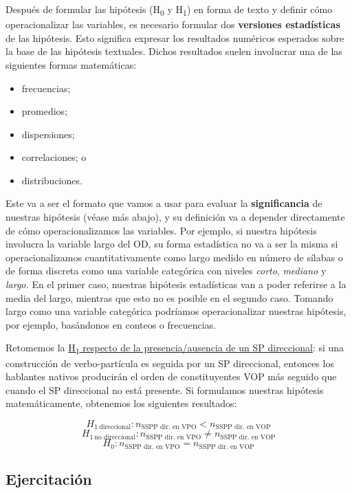 \documentclass[12pt,spanish,a4paper,]{article}
\providecommand{\tightlist}{%
  \setlength{\itemsep}{0pt}\setlength{\parskip}{0pt}}
\begin{document}
Después de formular las hipótesis (H\textsubscript{0} y
H\textsubscript{1}) en forma de texto y definir cómo operacionalizar las
variables, es necesario formular dos \textbf{versiones estadísticas} de
las hipótesis. Esto significa expresar los resultados numéricos
esperados sobre la base de las hipótesis textuales. Dichos resultados
suelen involucrar una de las siguientes formas matemáticas:

\begin{itemize}
\tightlist
\item
  frecuencias;
\item
  promedios;
\item
  dispersiones;
\item
  correlaciones; o
\item
  distribuciones.
\end{itemize}

Este va a ser el formato que vamos a usar para evaluar la
\textbf{significancia} de nuestras hipótesis (véase más abajo), y su
definición va a depender directamente de cómo operacionalizamos las
variables. Por ejemplo, si nuestra hipótesis involucra la variable largo
del OD, su forma estadística no va a ser la misma si operacionalizamos
cuantitativamente como largo medido en número de sílabas o de forma
discreta como una variable categórica con niveles \emph{corto},
\emph{mediano} y \emph{largo.} En el primer caso, nuestras hipótesis
estadísticas van a poder referirse a la media del largo, mientras que
esto no es posible en el segundo caso. Tomando largo como una variable
categórica podríamos operacionalizar nuestras hipótesis, por ejemplo,
basándonos en conteos o frecuencias.

Retomemos la \protect\hyperlink{h1}{H\textsubscript{1} respecto de la
presencia/ausencia de un SP direccional}: si una construcción de
verbo-partícula es seguida por un SP direccional, entonces los hablantes
nativos producirán el orden de constituyentes VOP más seguido que cuando
el SP direccional no está presente. Si formulamos nuestras hipótesis
matemáticamente, obtenemos los siguientes resultados:

\[H_{1~\textrm{direccional}}: n_{\textrm{SSPP dir. en VPO}} < n_{\textrm{SSPP dir. en VOP}}\]
\[H_{1~\textrm{no direccional}}: n_{\textrm{SSPP dir. en VPO}} \neq n_{\textrm{SSPP dir. en VOP}}\]
\[H_{0}: n_{\textrm{SSPP dir. en VPO}} =n_{\textrm{SSPP dir. en VOP}}\]

\hypertarget{ejercitacion-4}{%
\subsection{Ejercitación}\label{ejercitacion-4}}
\end{document}
